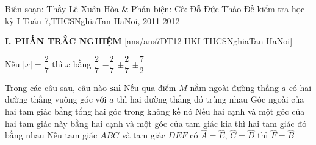 
	\begin{name}
		{Biên soạn: Thầy Lê Xuân Hòa \& Phản biện: Cô: Đỗ Đức Thảo}
		{Đề kiểm tra học kỳ I Toán 7,THCSNghiaTan-HaNoi, 2011-2012}
	\end{name}
	\noindent\textbf{I. PHẦN TRẮC NGHIỆM}
	\setcounter{ex}{0}
	[ans/ans7DT12-HKI-THCSNghiaTan-HaNoi]
\begin{ex}%
Nếu $|x| = \dfrac{2}{7}$ thì $x$ bằng
\choice
{$\dfrac{2}{7}$}
{$-\dfrac{2}{7}$}
{\True $\pm\dfrac{2}{7}$}
{$\pm\dfrac{7}{2}$}
\end{ex}	

\begin{ex}%
Trong các câu sau, câu nào \textbf{sai}
\choice
{Nếu qua điểm $M$ nằm ngoài đường thẳng $a$ có hai đường thẳng vuông góc với $a$ thì hai đường thẳng đó trùng nhau}
{Góc ngoài của hai tam giác bằng tổng hai góc trong không kề nó}
{\True Nếu hai cạnh và một góc của hai tam giác này bằng hai cạnh và một góc của tam giác kia thì hai tam giác đó bằng nhau}
{Nếu tam giác $ABC$ và tam giác $DEF$ có $\widehat{A} =\widehat{E}$, $\widehat{C}=\widehat{D}$ thì $\widehat{F}=\widehat{B}$}
\end{ex}	

